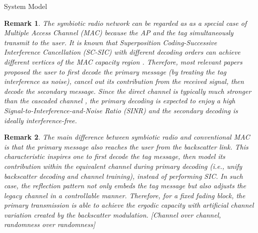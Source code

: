 \documentclass[journal]{IEEEtran}
\newtheorem{remark}{Remark}
\begin{document}
\begin{section}{System Model}
		\begin{remark}
			The symbiotic radio network can be regarded as as a special case of Multiple Access Channel (MAC) because the AP and the tag simultaneously transmit to the user. It is known that Superposition Coding-Successive Interference Cancellation (SC-SIC) with different decoding orders can achieve different vertices of the MAC capacity region \cite{Goldsmith2005}. Therefore, most relevant papers proposed the user to first decode the primary message (by treating the tag interference as noise), cancel out its contribution from the received signal, then decode the secondary message. Since the direct channel is typically much stronger than the cascaded channel \cite{Ozdogan2020}, the primary decoding is expected to enjoy a high Signal-to-Interference-and-Noise Ratio (SINR) and the secondary decoding is ideally interference-free.
		\end{remark}

		\begin{remark}
			The main difference between symbiotic radio and conventional MAC is that the primary message also reaches the user from the backscatter link. This characteristic inspires one to first decode the tag message, then model its contribution within the equivalent channel during primary decoding (i.e., unify backscatter decoding and channel training), instead of performing SIC. In such case, the reflection pattern not only embeds the tag message but also adjusts the legacy channel in a controllable manner. Therefore, for a fixed fading block, the primary transmission is able to achieve the ergodic capacity with artificial channel variation created by the backscatter modulation. [Channel over channel, randomness over randomness]
		\end{remark}


\end{section}
\end{document}
